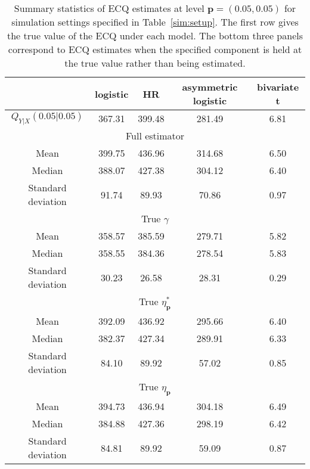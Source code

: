 \documentclass[11pt,letterpaper]{article}
\def\pb{{\mathbf p}}
\numberwithin{equation}{section}
\begin{document}
\begin{table}[H]
\footnotesize
\centering
\caption{Summary statistics of ECQ estimates at level $\pb=(0.05,0.05)$ for simulation settings specified in Table~\ref{sim:setup}. The first row gives the true value of the ECQ under each model. The bottom three panels correspond to ECQ estimates when the specified component is held at the true value rather than being estimated.}
\vspace{24pt}
\begin{tabular*}{1\textwidth}{@{\extracolsep{\fill}} c|cccc}\hline\hline
       & logistic & HR        & asymmetric logistic & bivariate t      \\ \hline\hline
$Q_{Y|X}(0.05|0.05)$ & 367.31 & 399.48    & 281.49            & 6.81\\  
\hline
   \multicolumn{5}{c}{Full estimator} \\   \hline
Mean  & 399.75 & 436.96    & 314.68           & 6.50 \\ 
Median & 388.07 & 427.38    & 304.12            & 6.40 \\ 
Standard deviation     & 91.74 & 89.93    & 70.86 & 0.97 \\ \hline
 \multicolumn{5}{c}{True $\gamma$} \\   \hline
Mean  & 358.57 & 385.59    & 279.71            & 5.82 \\ 
Median & 358.55 & 384.36    & 278.54            & 5.83 \\ 
Standard deviation     & 30.23 & 26.58    & 28.31             & 0.29 \\ 
\hline
 \multicolumn{5}{c}{True $\eta^*_\pb$} \\   \hline
Mean  & 392.09 & 436.92    & 295.66           & 6.40 \\ 
Median & 382.37 & 427.34   & 289.91            & 6.33 \\ 
Standard deviation     & 84.10 & 89.92   & 57.02   & 0.85 \\ \hline 
\multicolumn{5}{c}{True $\eta_\pb$} \\   \hline
Mean  & 394.73 & 436.94    & 304.18            & 6.49 \\ 
Median & 384.88 & 427.36    & 298.19            & 6.42 \\ 
Standard deviation     & 84.81 & 89.92    & 59.09    & 0.87 \\ \hline\hline
\end{tabular*}
\label{sim:summary}
\end{table}
\end{document}
